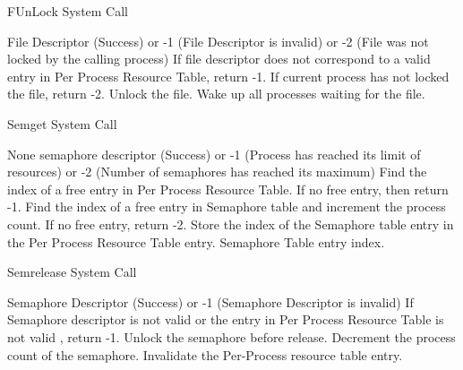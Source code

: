 
\begin{algorithm}
\caption{FUnLock System Call}
\begin{algorithmic}
\REQUIRE File Descriptor
 (Success) or -1 (File Descriptor is invalid) or -2 (File was not locked by the calling process)
\STATE If file descriptor does not correspond to a valid entry in Per Process Resource Table, return -1.
    \STATE If current process has not locked the file, return -2.
    \STATE Unlock the file.
    \STATE Wake up all processes waiting for the file.
\ENDIF
{}
\end{algorithmic}
\end{algorithm}



\begin{algorithm}
\caption{Semget System Call}
\begin{algorithmic}
\REQUIRE None
\ENSURE semaphore descriptor (Success) or -1 (Process has reached its limit of resources) or -2 (Number of semaphores has reached its maximum)
\STATE Find the index of a free entry in Per Process Resource Table. If no free entry, then return -1.
\STATE Find the index of a free entry in Semaphore table and increment the process count. If no free entry, return -2.
\STATE Store the index of the Semaphore table entry in the Per Process Resource Table entry.  
\RETURN Semaphore Table entry index.  
\end{algorithmic}
\end{algorithm}


\begin{algorithm}
\caption{Semrelease System Call}
\begin{algorithmic}
\REQUIRE Semaphore Descriptor
 (Success) or -1 (Semaphore Descriptor is invalid)
\STATE If Semaphore descriptor is not valid or the entry in Per Process Resource Table is not valid , return -1.
    \STATE Unlock the semaphore before release.
\ENDIF
\STATE Decrement the process count of the semaphore.
\STATE Invalidate the Per-Process resource table entry.  
\end{algorithmic}
\end{algorithm}

